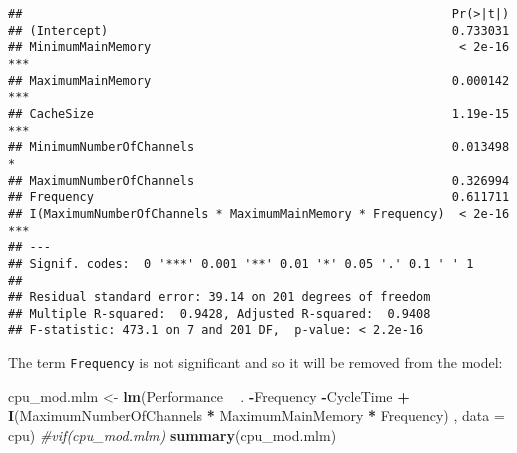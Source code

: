 \documentclass[12pt]{article}
\newenvironment{Shaded}{\begin{snugshade}}{\end{snugshade}}
\newcommand{\CommentTok}[1]{\textcolor[rgb]{0.56,0.35,0.01}{\textit{#1}}}
\newcommand{\DataTypeTok}[1]{\textcolor[rgb]{0.13,0.29,0.53}{#1}}
\newcommand{\KeywordTok}[1]{\textcolor[rgb]{0.13,0.29,0.53}{\textbf{#1}}}
\newcommand{\NormalTok}[1]{#1}
\newcommand{\OperatorTok}[1]{\textcolor[rgb]{0.81,0.36,0.00}{\textbf{#1}}}
\newcommand{\StringTok}[1]{\textcolor[rgb]{0.31,0.60,0.02}{#1}}
\begin{document}
\begin{verbatim}
##                                                            Pr(>|t|)    
## (Intercept)                                                0.733031    
## MinimumMainMemory                                           < 2e-16 ***
## MaximumMainMemory                                          0.000142 ***
## CacheSize                                                  1.19e-15 ***
## MinimumNumberOfChannels                                    0.013498 *  
## MaximumNumberOfChannels                                    0.326994    
## Frequency                                                  0.611711    
## I(MaximumNumberOfChannels * MaximumMainMemory * Frequency)  < 2e-16 ***
## ---
## Signif. codes:  0 '***' 0.001 '**' 0.01 '*' 0.05 '.' 0.1 ' ' 1
## 
## Residual standard error: 39.14 on 201 degrees of freedom
## Multiple R-squared:  0.9428, Adjusted R-squared:  0.9408 
## F-statistic: 473.1 on 7 and 201 DF,  p-value: < 2.2e-16
\end{verbatim}

The term \texttt{Frequency} is not significant and so it will be removed
from the model:

\begin{Shaded}
\begin{Highlighting}[]
\NormalTok{cpu_mod.mlm <-}\StringTok{ }\KeywordTok{lm}\NormalTok{(Performance }\OperatorTok{~}\StringTok{ }\NormalTok{. }\OperatorTok{-}\NormalTok{Frequency }\OperatorTok{-}\NormalTok{CycleTime }\OperatorTok{+}\StringTok{ }\KeywordTok{I}\NormalTok{(MaximumNumberOfChannels }\OperatorTok{*}\StringTok{ }\NormalTok{MaximumMainMemory }\OperatorTok{*}\StringTok{ }\NormalTok{Frequency)  , }\DataTypeTok{data =}\NormalTok{ cpu) }
\CommentTok{#vif(cpu_mod.mlm)}
 \KeywordTok{summary}\NormalTok{(cpu_mod.mlm)}
\end{Highlighting}
\end{Shaded}
\end{document}
